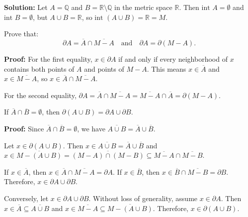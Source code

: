 \textbf{Solution:} Let $A = \mathbb{Q}$ and $B = \mathbb{R} \setminus \mathbb{Q}$ in the metric space $\mathbb{R}$. Then $\text{int } A = \emptyset$ and $\text{int } B = \emptyset$, but $A \cup B = \mathbb{R}$, so $\text{int } (A \cup B) = \mathbb{R} = M$.

\begin{problembox}
Prove that:
\[
\partial A = \overline{A} \cap \overline{M - A} \quad \text{and} \quad \partial A = \partial(M - A).
\]
\end{problembox}

\textbf{Proof:} For the first equality, $x \in \partial A$ if and only if every neighborhood of $x$ contains both points of $A$ and points of $M - A$. This means $x \in \overline{A}$ and $x \in \overline{M - A}$, so $x \in \overline{A} \cap \overline{M - A}$.

For the second equality, $\partial A = \overline{A} \cap \overline{M - A} = \overline{M - A} \cap \overline{A} = \partial(M - A)$.

\begin{problembox}
If \(\overline{A} \cap \overline{B} = \emptyset\), then \(\partial(A \cup B) = \partial A \cup \partial B\).
\end{problembox}

\textbf{Proof:} Since $\overline{A} \cap \overline{B} = \emptyset$, we have $\overline{A \cup B} = \overline{A} \cup \overline{B}$.

Let $x \in \partial(A \cup B)$. Then $x \in \overline{A \cup B} = \overline{A} \cup \overline{B}$ and $x \in \overline{M - (A \cup B)} = \overline{(M - A) \cap (M - B)} \subseteq \overline{M - A} \cap \overline{M - B}$.

If $x \in \overline{A}$, then $x \in \overline{A} \cap \overline{M - A} = \partial A$. If $x \in \overline{B}$, then $x \in \overline{B} \cap \overline{M - B} = \partial B$. Therefore, $x \in \partial A \cup \partial B$.

Conversely, let $x \in \partial A \cup \partial B$. Without loss of generality, assume $x \in \partial A$. Then $x \in \overline{A} \subseteq \overline{A \cup B}$ and $x \in \overline{M - A} \subseteq \overline{M - (A \cup B)}$. Therefore, $x \in \partial(A \cup B)$.


